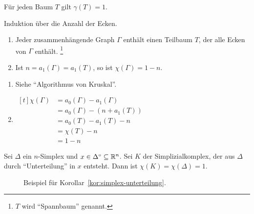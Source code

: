 \begin{korollar}
    Für jeden Baum $T$ gilt $\gamma(T) = 1$.
\end{korollar}

\begin{beweis}
    Induktion über die Anzahl der Ecken.
\end{beweis}

\begin{korollar}
    \begin{enumerate}[label=\alph*),ref=\theplaindefinition.\alph*]
        \item Jeder zusammenhängende Graph $\Gamma$ enthält einen
              Teilbaum $T$, der alle Ecken von $\Gamma$ enthält.%
              \footnote{$T$ wird \enquote{Spannbaum} genannt.}
        \item Ist $n = a_1(\Gamma) = a_1(T)$, so ist $\chi(\Gamma) = 1 - n$.
    \end{enumerate}
\end{korollar}

\begin{beweis}\leavevmode
    \begin{enumerate}[label=\alph*),ref=\theplaindefinition.\alph*]
        \item Siehe \enquote{Algorithmus von Kruskal}.
        \item $\begin{aligned}[t]\chi(\Gamma) &= a_0(\Gamma) - a_1(\Gamma)\\
                                        &= a_0(\Gamma) - (n+a_1(T))\\
                                        &= a_0(T) - a_1(T) - n\\
                                        &= \chi(T) - n\\
                                        &= 1-n
              \end{aligned}$
    \end{enumerate}
\end{beweis}

\begin{korollar}\label{kor:simplex-unterteilung}
    Sei $\Delta$ ein $n$-Simplex und $x \in \Delta^\circ \subseteq \mathbb{R}^n$.
    Sei $K$ der Simplizialkomplex, der aus $\Delta$ durch 
    \enquote{Unterteilung} in $x$ entsteht. Dann ist $\chi(K) = \chi(\Delta) = 1$.
\end{korollar}

\begin{figure}[ht]
    \centering
    \subfloat[$K$]{
        \parbox{4cm}{\centering}
        \label{fig:topology-simplizial-complex-k}
    }%
    \label{fig:korollar-beispiel}
    \caption{Beispiel für Korollar~\ref{kor:simplex-unterteilung}.}
\end{figure}

